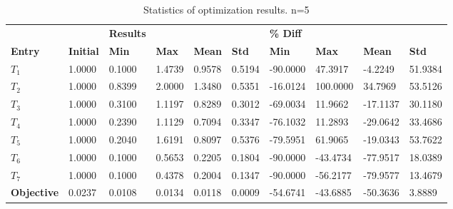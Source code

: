 \begin{table}[H]
\centering
\begin{tabular}{llllllllll}
\textbf{} & \textbf{} & \cellcolor[HTML]{EFEFEF}\textbf{Results} & \cellcolor[HTML]{EFEFEF} & \cellcolor[HTML]{EFEFEF} & \cellcolor[HTML]{EFEFEF} & \cellcolor[HTML]{EFEFEF}\textbf{\% Diff} & \cellcolor[HTML]{EFEFEF} & \cellcolor[HTML]{EFEFEF} & \cellcolor[HTML]{EFEFEF} \\
\rowcolor[HTML]{EFEFEF} 
\textbf{Entry} & \textbf{Initial} & \textbf{Min} & \textbf{Max} & \textbf{Mean} & \textbf{Std} & \textbf{Min} & \textbf{Max} & \textbf{Mean} & \textbf{Std} \\
$T_1$ & 1.0000 & 0.1000 & 1.4739 & 0.9578 & 0.5194 & -90.0000 & 47.3917 & -4.2249 & 51.9384 \\ 
$T_2$ & 1.0000 & 0.8399 & 2.0000 & 1.3480 & 0.5351 & -16.0124 & 100.0000 & 34.7969 & 53.5126 \\ 
$T_3$ & 1.0000 & 0.3100 & 1.1197 & 0.8289 & 0.3012 & -69.0034 & 11.9662 & -17.1137 & 30.1180 \\ 
$T_4$ & 1.0000 & 0.2390 & 1.1129 & 0.7094 & 0.3347 & -76.1032 & 11.2893 & -29.0642 & 33.4686 \\ 
$T_5$ & 1.0000 & 0.2040 & 1.6191 & 0.8097 & 0.5376 & -79.5951 & 61.9065 & -19.0343 & 53.7622 \\ 
$T_6$ & 1.0000 & 0.1000 & 0.5653 & 0.2205 & 0.1804 & -90.0000 & -43.4734 & -77.9517 & 18.0389 \\ 
$T_7$ & 1.0000 & 0.1000 & 0.4378 & 0.2004 & 0.1347 & -90.0000 & -56.2177 & -79.9577 & 13.4679 \\ 
\rowcolor[HTML]{EFEFEF} 
\textbf{Objective} & 0.0237 & 0.0108 & 0.0134 & 0.0118 & 0.0009 & -54.6741 & -43.6885 & -50.3636 & 3.8889 \\ 
\end{tabular}
\caption{Statistics of optimization results. n=5}
\label{tab:StatisticsOptimizationAnalysis}
\end{table}